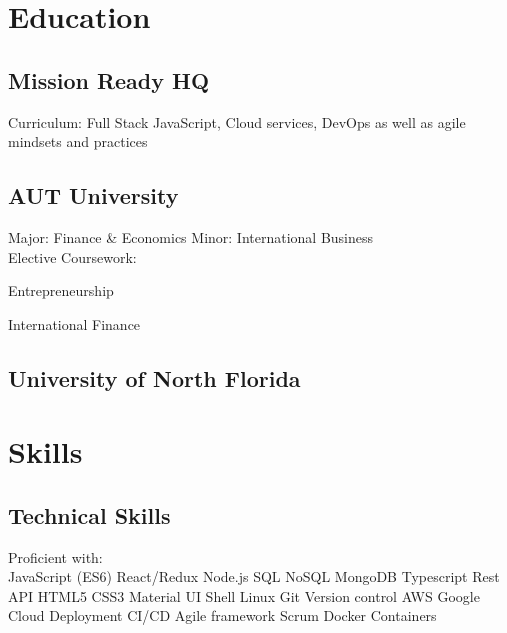 \documentclass[]{deedy-resume-openfont}
\begin{document}
\begin{minipage}[t]{3.2in} 


\section{Education} 

\subsection{Mission Ready HQ}
Curriculum: Full Stack JavaScript, Cloud services, DevOps as well as agile mindsets and practices \\
\sectionsep

\subsection{AUT University}
Major: Finance \& Economics \textbullet{}Minor: International Business \\
Elective Coursework:\\
\vspace{\topsep} %
\begin{tightemize}
\item Entrepreneurship \\
\item International Finance \\
\end{tightemize}
\sectionsep

\subsection{University of North Florida}
\sectionsep


\section{Skills}
\subsection{Technical Skills}
Proficient with: \\
\textbullet{}JavaScript (ES6) \textbullet{}React/Redux \textbullet{}Node.js \textbullet{}SQL \textbullet{}NoSQL \textbullet{}MongoDB \textbullet{}Typescript \textbullet{}Rest API \textbullet{}HTML5 \textbullet{}CSS3 \textbullet{}Material UI \textbullet{}Shell \textbullet{}Linux \textbullet{}Git \textbullet{}Version control \textbullet{}AWS \textbullet{}Google Cloud  \textbullet{}Deployment \textbullet{}CI/CD \textbullet{}Agile framework \textbullet{}Scrum \textbullet{}Docker \textbullet{}Containers 
\sectionsep


\end{minipage}
\end{document}
